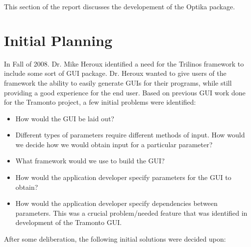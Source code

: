 This section of the report discusses the developement of the Optika package.

\section{Initial Planning}
In Fall of 2008. Dr. Mike Heroux identified a need for
the Trilinos framework to include some sort of GUI package. Dr. Heroux wanted 
to give users of the framework the ability to easily generate GUIs for their
programs, while still providing a good experience for the end user. Based on
previous GUI work done for the Tramonto project, a few initial problems were
identified:

	\begin{itemize}
		\item How would the GUI be laid out?
		\item Different types of parameters require different methods of input.
			How would we decide how we would obtain input for a particular
			parameter?
		\item What framework would we use to build the GUI?
		\item How would the application developer specify parameters for the
			GUI to obtain?
		\item How would the application developer specify dependencies between
		parameters. This was a crucial problem/needed feature that was identified in
		development of the Tramonto GUI.
	\end{itemize}

After some deliberation, the following initial solutions were decided upon:


